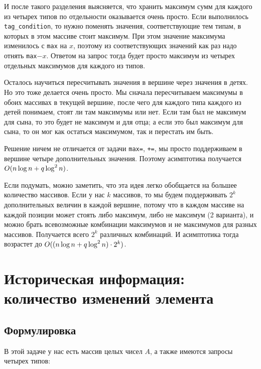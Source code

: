 И после такого разделения выясняется, что хранить максимум сумм для каждого из четырех типов по отдельности оказывается очень просто. Если выполнилось \verb+tag_condition+, то нужно поменять значения, соответствующие тем типам, в которых в этом массиве стоит максимум. При этом значение максимума изменилось с \verb+max+ на $x$, поэтому из соответствующих значений как раз надо отнять \verb+max+$-x$.
Ответом на запрос тогда будет просто максимум из четырех отдельных максимумов для каждого из типов.

Осталось научиться пересчитывать значения в вершине через значения в детях. Но это тоже делается очень просто. Мы сначала пересчитываем максимумы в обоих массивах в текущей вершине, после чего для каждого типа каждого из детей понимаем, стоят ли там максимумы или нет. Если там был не максимум для сына, то это будет не максимум и для отца; а если это был максимум для сына, то он мог как остаться максимумом, так и перестать им быть.

Решение ничем не отличается от задачи \verb+max=+, \verb^+=^, мы просто поддерживаем в вершине четыре дополнительных значения. Поэтому асимптотика получается $O(n \log n + q \log^2 n)$.

\begin{observation}
    Если подумать, можно заметить, что эта идея легко обобщается на большее количество массивов. Если у нас $k$ массивов, то мы будем поддерживать $2^k$ дополнительных величин в каждой вершине, потому что в каждом массиве на каждой позиции может стоять либо максимум, либо не максимум (2 варианта), и можно брать всевозможные комбинации максимумов и не максимумов для разных массивов. Получается всего $2^k$ различных комбинаций. И асимптотика тогда возрастет до $O((n \log n + q \log^2 n) \cdot 2^k)$.
\end{observation}






\cprotect \section{Историческая информация: количество изменений элемента}

\subsection{Формулировка}

В этой задаче у нас есть массив целых чисел $A$, а также имеются запросы четырех типов:

